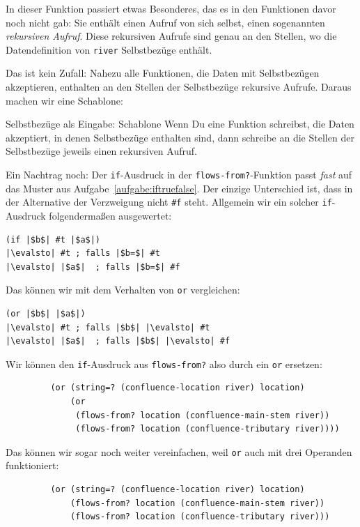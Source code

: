 In dieser Funktion passiert etwas Besonderes, das es in den
Funktionen davor noch nicht gab: Sie enthält einen Aufruf von sich
selbst, einen sogenannten \textit{rekursiven Aufruf}.  Diese rekursiven Aufrufe sind genau an den Stellen, wo
die Datendefinition von \lstinline{river} Selbstbezüge enthält.

Das ist kein Zufall: Nahezu alle Funktionen, die Daten mit
Selbstbezügen akzeptieren, enthalten an den Stellen der Selbstbezüge
rekursive Aufrufe.  Daraus machen wir eine Schablone:
%
\begin{konstruktionsanleitung}{Selbstbezüge als Eingabe: Schablone}
  \label{ka:selbstbezug-schablone}
  Wenn Du eine Funktion schreibst, die Daten akzeptiert, in denen
  Selbstbezüge enthalten sind, dann schreibe an die Stellen der
  Selbstbezüge jeweils einen rekursiven Aufruf.
\end{konstruktionsanleitung}
%
Ein Nachtrag noch: Der \lstinline{if}-Ausdruck in der
\lstinline{flows-from?}-Funktion passt \emph{fast} auf das Muster
aus Aufgabe~\ref{aufgabe:iftruefalse}.  Der einzige Unterschied ist,
dass in der Alternative der Verzweigung nicht \lstinline{#f} steht.
Allgemein wir ein solcher \lstinline{if}-Ausdruck folgendermaßen
ausgewertet:
%
\begin{lstlisting}
(if |$b$| #t |$a$|)
|\evalsto| #t ; falls |$b=$| #t
|\evalsto| |$a$|  ; falls |$b=$| #f
\end{lstlisting}
%
Das können wir mit dem Verhalten von \lstinline{or} vergleichen:
%
\begin{lstlisting}
(or |$b$| |$a$|)
|\evalsto| #t ; falls |$b$| |\evalsto| #t
|\evalsto| |$a$|  ; falls |$b$| |\evalsto| #f
\end{lstlisting}
%
Wir können den \lstinline{if}-Ausdruck aus \lstinline{flows-from?}
also durch ein \lstinline{or} ersetzen:
%
\begin{lstlisting}
         (or (string=? (confluence-location river) location)
             (or
              (flows-from? location (confluence-main-stem river))
              (flows-from? location (confluence-tributary river))))
\end{lstlisting}
%
Das können wir sogar noch weiter vereinfachen, weil \lstinline{or}
auch mit drei Operanden funktioniert:
%
\begin{lstlisting}
         (or (string=? (confluence-location river) location)
             (flows-from? location (confluence-main-stem river))
             (flows-from? location (confluence-tributary river)))
\end{lstlisting}
